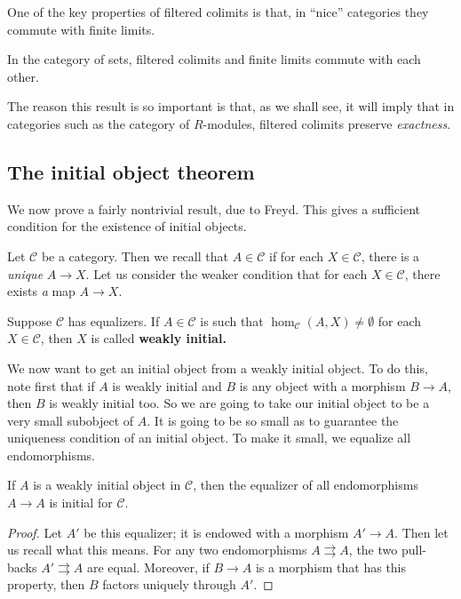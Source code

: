 \begin{proposition}
One of the key properties of filtered colimits is that, in ``nice'' categories they commute with
finite limits.

\begin{proposition} 
In the category of sets, filtered colimits and finite limits commute with each
other.
\end{proposition} 

The reason this result is so important is that, as we shall see, it will imply
that in categories such as the category of $R$-modules, filtered colimits
preserve \emph{exactness}. 


\subsection{The initial object theorem}

We now prove a fairly nontrivial result, due to Freyd. This gives a sufficient
condition for the existence of initial objects.

Let $\mathcal{C}$ be a category. Then we recall that $A \in \mathcal{C}$ if
for each $X \in \mathcal{C}$, there is a \emph{unique} $A \to X$.
Let us consider the weaker condition that for each $ X \in \mathcal{C}$, there
exists \emph{a} map $A \to X$.

\begin{definition} Suppose $\mathcal{C}$ has equalizers.
If $A \in \mathcal{C}$ is such that $\hom_{\mathcal{C}}(A, X) \neq \emptyset$
for each $X \in \mathcal{C}$, then $X$ is called \textbf{weakly initial.}
\end{definition}

We now want to get an initial object from a weakly initial object.
To do this, note first that if $A$ is weakly initial and $B$ is any object
with a morphism $B \to A$, then $B$ is weakly initial too. So we are going to
take
our initial object to be a very small subobject of $A$.
It is going to be so small as to guarantee the uniqueness condition of an
initial object. To make it small, we equalize all endomorphisms.

\begin{proposition} \label{weakinitial}
If  $A$ is a weakly initial object in $\mathcal{C}$,
then the equalizer of all endomorphisms $A \to A$ is initial for $\mathcal{C}$.
\end{proposition}
\begin{proof}
Let $A'$ be this equalizer; it is endowed with a morphism $A'\to A$. Then let
us recall what this means. For any two
endomorphisms $A \rightrightarrows A$, the two pull-backs $A'
\rightrightarrows A$ are equal. Moreover, if $B \to A$ is a morphism that has
this property, then $B$ factors uniquely through $A'$.


\end{proof}
\end{proposition}
